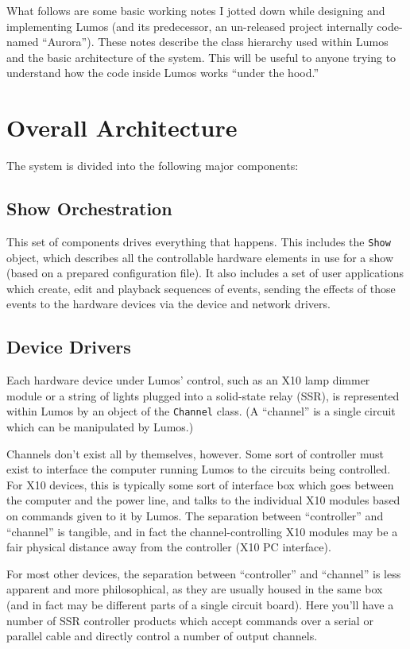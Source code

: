 \documentclass{article}
\begin{document}
What follows are some basic working notes I jotted down while designing and
implementing Lumos (and its predecessor, an un-released project internally
code-named ``Aurora'').  These notes describe the class hierarchy used within
Lumos and the basic architecture of the system.  This will be useful to anyone
trying to understand how the code inside Lumos works ``under the hood.''

\section{Overall Architecture}

The system is divided into the following major components:

\subsection{Show Orchestration}
This set of components drives everything that happens.  This includes
the {\tt Show} object, which describes all the controllable hardware 
elements in use for a show (based on a prepared configuration file).
It also includes a set of user applications which create, edit and playback
sequences of events, sending the effects of those events to the hardware
devices via the device and network drivers.

\subsection{Device Drivers}
Each hardware device under Lumos' control, such as an X10 lamp dimmer module
or a string of lights plugged into a solid-state relay (SSR), is represented 
within Lumos by an object of the {\tt Channel} class.  
(A ``channel'' is a single circuit which can be manipulated by Lumos.) 

Channels don't exist all by themselves, however.  Some sort of controller 
must exist to interface the computer running Lumos to the circuits being
controlled.  For X10 devices, this is typically some sort of interface box
which goes between the computer and the power line, and talks to the
individual X10 modules based on commands given to it by Lumos.  The separation
between ``controller'' and ``channel'' is tangible, and in fact the 
channel-controlling X10 modules may be a fair physical distance away from the
controller (X10 PC interface).

For most other devices, the separation between ``controller'' and
``channel'' is less apparent and more philosophical, as they are usually
housed in the same box (and in fact may be different parts of a single
circuit board).  Here you'll have a number of SSR controller products
which accept commands over a serial or parallel cable and directly
control a number of output channels.
\end{document}
